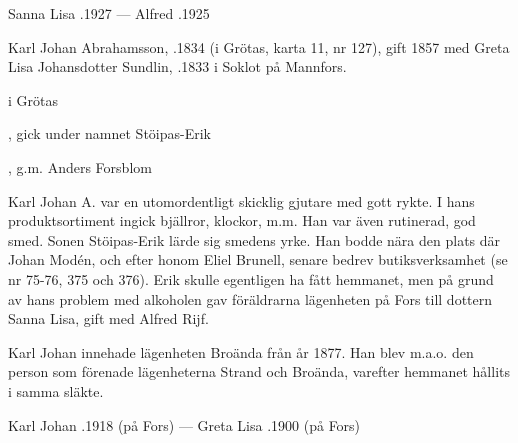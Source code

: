Sanna Lisa .1927  ---  Alfred .1925





Karl Johan Abrahamsson, .1834 (i Grötas, karta 11, nr 127), gift 1857 med Greta Lisa Johansdotter Sundlin, .1833 i Soklot på Mannfors.
\begin{jhchildren}
  \item {} i Grötas
  \item {}
  \item {}, gick under namnet Stöipas-Erik
  \item {}
  \item {}
  \item {}, g.m. Anders Forsblom
\end{jhchildren}

Karl Johan A. var en utomordentligt skicklig gjutare med gott rykte. I hans produktsortiment ingick bjällror, klockor, m.m. Han var även rutinerad, god smed. Sonen Stöipas-Erik lärde sig smedens yrke. Han bodde nära den plats där Johan Modén, och efter honom Eliel Brunell, senare bedrev butiksverksamhet (se nr 75-76, 375 och 376). Erik skulle egentligen ha fått hemmanet, men på grund av hans problem med alkoholen gav föräldrarna lägenheten på Fors till dottern Sanna Lisa, gift med Alfred Rijf.

Karl Johan innehade lägenheten Broända från år 1877. Han blev m.a.o. den person som förenade lägenheterna Strand och Broända, varefter hemmanet hållits i samma släkte.

Karl Johan .1918 (på Fors)  ---  Greta Lisa .1900 (på Fors)





